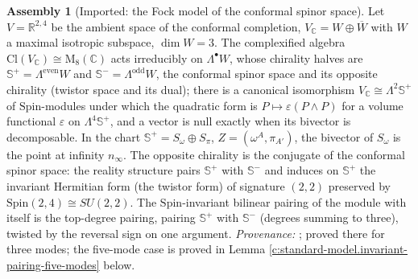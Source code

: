 \documentclass[11pt]{article}
\theoremstyle{definition}
\newtheorem{assembled}[theorem]{Assembly}
\theoremstyle{plain}
\newcommand{\changedmark}[2]{\marginpar{\raggedright\scriptsize\color{#1}#2}}
\providecommand{\C}{}\renewcommand{\C}{\mathbb{C}}
\providecommand{\CS}{}\renewcommand{\CS}{{\mathbb{S}^{+}}}
\providecommand{\CSm}{}\renewcommand{\CSm}{{\mathbb{S}^{-}}}
\providecommand{\Cl}{}\renewcommand{\Cl}{\mathrm{Cl}}
\providecommand{\R}{}\renewcommand{\R}{\mathbb{R}}
\providecommand{\Som}{}\renewcommand{\Som}{S_\omega}
\providecommand{\Spi}{}\renewcommand{\Spi}{S_\pi}
\begin{document}
\begin{assembled}[Imported: the Fock model of the conformal spinor space]\label{c:standard-model.imported-fock-model-twistor-space}
\changedmark{gray}{reworded}
Let $V = \R^{2,4}$ be the ambient space of the conformal completion, $V_{\C} = W \oplus \overline{W}$ with $W$ a maximal isotropic subspace, $\dim W = 3$. The complexified algebra $\Cl(V_{\C}) \cong \mathrm{M}_{8}(\C)$ acts irreducibly on $\Lambda^{\bullet}W$, whose chirality halves are $\CS = \Lambda^{\mathrm{even}}W$ and $\CSm = \Lambda^{\mathrm{odd}}W$, the conformal spinor space and its opposite chirality (twistor space and its dual); there is a canonical isomorphism $V_{\C} \cong \Lambda^{2}\CS$ of $\mathrm{Spin}$-modules under which the quadratic form is $P \mapsto \varepsilon(P \wedge P)$ for a volume functional $\varepsilon$ on $\Lambda^{4}\CS$, and a vector is null exactly when its bivector is decomposable. In the chart $\CS = \Som \oplus \Spi$, $Z = (\omega^{A}, \pi_{A'})$, the bivector of $\Som$ is the point at infinity $n_{\infty}$. The opposite chirality is the conjugate of the conformal spinor space: the reality structure pairs $\CS$ with $\CSm$ and induces on $\CS$ the invariant Hermitian form (the twistor form) of signature $(2,2)$ preserved by $\mathrm{Spin}(2,4) \cong SU(2,2)$. The $\mathrm{Spin}$-invariant bilinear pairing of the module with itself is the top-degree pairing, pairing $\CS$ with $\CSm$ (degrees summing to three), twisted by the reversal sign on one argument. \emph{Provenance:} \cite[Thms.~3.1, 3.4, Prop.~4.5]{ButlerT9}; proved there for three modes; the five-mode case is proved in Lemma \ref{c:standard-model.invariant-pairing-five-modes} below.
\end{assembled}
\end{document}
